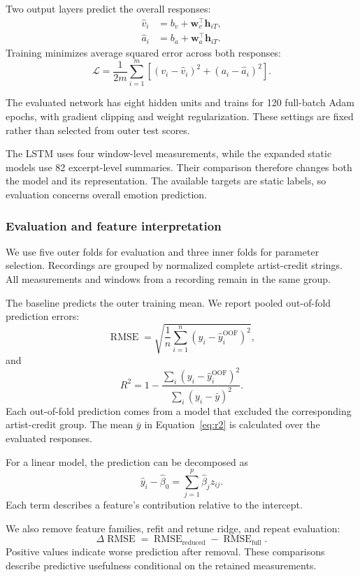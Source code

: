 Two output layers predict the overall responses:
\begin{align}
\widehat v_i &= b_v+\mathbf w_v^\top\mathbf h_{iT},\\
\widehat a_i &= b_a+\mathbf w_a^\top\mathbf h_{iT}.
\end{align}
Training minimizes average squared error across both responses:
\begin{equation}
\mathcal L=
\frac{1}{2m}\sum_{i=1}^{m}
\left[
(v_i-\widehat v_i)^2+
(a_i-\widehat a_i)^2
\right].
\end{equation}

The evaluated network has eight hidden units and trains for 120 full-batch Adam epochs, with gradient clipping and weight regularization. These settings are fixed rather than selected from outer test scores.

The LSTM uses four window-level measurements, while the expanded static models use 82 excerpt-level summaries. Their comparison therefore changes both the model and its representation. The available targets are static labels, so evaluation concerns overall emotion prediction.

\subsubsection{Evaluation and feature interpretation}

We use five outer folds for evaluation and three inner folds for parameter selection. Recordings are grouped by normalized complete artist-credit strings. All measurements and windows from a recording remain in the same group.

The baseline predicts the outer training mean. We report pooled out-of-fold prediction errors:
\begin{equation}
\operatorname{RMSE}
=
\sqrt{
\frac{1}{n}\sum_{i=1}^{n}
(y_i-\widehat y_i^{\mathrm{OOF}})^2
},
\label{eq:rmse}
\end{equation}
and
\begin{equation}
R^2=
1-
\frac{\sum_i(y_i-\widehat y_i^{\mathrm{OOF}})^2}
{\sum_i(y_i-\bar y)^2}.
\label{eq:r2}
\end{equation}
Each out-of-fold prediction comes from a model that excluded the corresponding artist-credit group. The mean $\bar y$ in Equation~\eqref{eq:r2} is calculated over the evaluated responses.

For a linear model, the prediction can be decomposed as
\begin{equation}
\widehat y_i-\widehat\beta_0
=
\sum_{j=1}^{p}\widehat\beta_jz_{ij}.
\label{eq:contributions}
\end{equation}
Each term describes a feature's contribution relative to the intercept.

We also remove feature families, refit and retune ridge, and repeat evaluation:
\begin{equation}
\Delta\operatorname{RMSE}
=
\operatorname{RMSE}_{\mathrm{reduced}}
-
\operatorname{RMSE}_{\mathrm{full}}.
\label{eq:ablation}
\end{equation}
Positive values indicate worse prediction after removal. These comparisons describe predictive usefulness conditional on the retained measurements.
